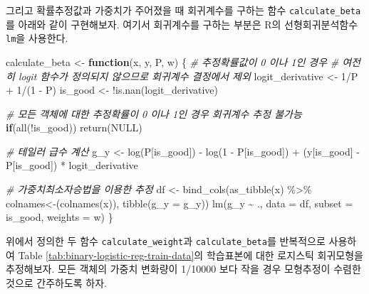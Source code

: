 \documentclass[
]{book}
\newenvironment{Shaded}{\begin{snugshade}}{\end{snugshade}}
\newcommand{\AttributeTok}[1]{\textcolor[rgb]{0.77,0.63,0.00}{#1}}
\newcommand{\CommentTok}[1]{\textcolor[rgb]{0.56,0.35,0.01}{\textit{#1}}}
\newcommand{\ConstantTok}[1]{\textcolor[rgb]{0.00,0.00,0.00}{#1}}
\newcommand{\ControlFlowTok}[1]{\textcolor[rgb]{0.13,0.29,0.53}{\textbf{#1}}}
\newcommand{\DecValTok}[1]{\textcolor[rgb]{0.00,0.00,0.81}{#1}}
\newcommand{\FunctionTok}[1]{\textcolor[rgb]{0.00,0.00,0.00}{#1}}
\newcommand{\NormalTok}[1]{#1}
\newcommand{\OtherTok}[1]{\textcolor[rgb]{0.56,0.35,0.01}{#1}}
\newcommand{\SpecialCharTok}[1]{\textcolor[rgb]{0.00,0.00,0.00}{#1}}
\newcommand{\StringTok}[1]{\textcolor[rgb]{0.31,0.60,0.02}{#1}}
\begin{document}
그리고 확률추정값과 가중치가 주어졌을 때 회귀계수를 구하는 함수 \texttt{calculate\_beta}를 아래와 같이 구현해보자. 여기서 회귀계수를 구하는 부분은 R의 선형회귀분석함수 \texttt{lm}을 사용한다.

\begin{Shaded}
\begin{Highlighting}[]
\NormalTok{calculate\_beta }\OtherTok{\textless{}{-}} \ControlFlowTok{function}\NormalTok{(x, y, P, w) \{}
  \CommentTok{\# 추정확률값이 0 이나 1인 경우 }
  \CommentTok{\# 여전히 logit 함수가 정의되지 않으므로 회귀계수 결정에서 제외}
\NormalTok{  logit\_derivative }\OtherTok{\textless{}{-}} \DecValTok{1}\SpecialCharTok{/}\NormalTok{P }\SpecialCharTok{+} \DecValTok{1}\SpecialCharTok{/}\NormalTok{(}\DecValTok{1} \SpecialCharTok{{-}}\NormalTok{ P)}
\NormalTok{  is\_good }\OtherTok{\textless{}{-}} \SpecialCharTok{!}\FunctionTok{is.nan}\NormalTok{(logit\_derivative)}
  
  \CommentTok{\# 모든 객체에 대한 추정확률이 0 이나 1인 경우 회귀계수 추정 불가능}
  \ControlFlowTok{if}\NormalTok{(}\FunctionTok{all}\NormalTok{(}\SpecialCharTok{!}\NormalTok{is\_good)) }\FunctionTok{return}\NormalTok{(}\ConstantTok{NULL}\NormalTok{)}
  
  \CommentTok{\# 테일러 급수 계산}
\NormalTok{  g\_y }\OtherTok{\textless{}{-}} \FunctionTok{log}\NormalTok{(P[is\_good]) }\SpecialCharTok{{-}} 
    \FunctionTok{log}\NormalTok{(}\DecValTok{1} \SpecialCharTok{{-}}\NormalTok{ P[is\_good]) }\SpecialCharTok{+} 
\NormalTok{    (y[is\_good] }\SpecialCharTok{{-}}\NormalTok{ P[is\_good]) }\SpecialCharTok{*}\NormalTok{ logit\_derivative}
  
  \CommentTok{\# 가중치최소자승법을 이용한 추정}
\NormalTok{  df }\OtherTok{\textless{}{-}} \FunctionTok{bind\_cols}\NormalTok{(}\FunctionTok{as\_tibble}\NormalTok{(x) }\SpecialCharTok{\%\textgreater{}\%} 
                    \StringTok{\textasciigrave{}}\AttributeTok{colnames\textless{}{-}}\StringTok{\textasciigrave{}}\NormalTok{(}\FunctionTok{colnames}\NormalTok{(x)), }
                  \FunctionTok{tibble}\NormalTok{(}\AttributeTok{g\_y =}\NormalTok{ g\_y))}
  \FunctionTok{lm}\NormalTok{(g\_y }\SpecialCharTok{\textasciitilde{}}\NormalTok{ ., }\AttributeTok{data =}\NormalTok{ df, }\AttributeTok{subset =}\NormalTok{ is\_good, }\AttributeTok{weights =}\NormalTok{ w)}
\NormalTok{\}}
\end{Highlighting}
\end{Shaded}

위에서 정의한 두 함수 \texttt{calculate\_weight}과 \texttt{calculate\_beta}를 반복적으로 사용하여 Table \ref{tab:binary-logistic-reg-train-data}의 학습표본에 대한 로지스틱 회귀모형을 추정해보자. 모든 객체의 가중치 변화량이 1/10000 보다 작을 경우 모형추정이 수렴한 것으로 간주하도록 하자.
\end{document}
